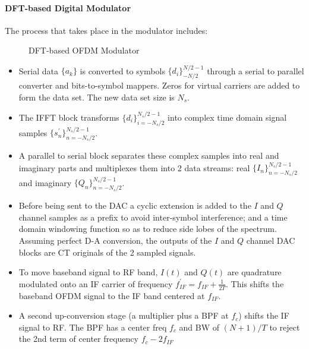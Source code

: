 \paragraph{\gls{DFT}-based Digital Modulator}
The process that takes place in the modulator includes\cite{fuqin}:
\begin{figure}[h!]
	\centerline{\resizebox{16cm}{!}{}}
	\caption{\gls{DFT}-based \gls{OFDM} Modulator}
	\label{fig:dft_mod}
\end{figure}
\begin{itemize}
	\item Serial data $\{ a_k\}$ is converted to symbols  $\{ d_i\}_{-N/2}^{N/2-1}$ through a serial to parallel converter and bits-to-symbol mappers. Zeros for virtual carriers are added to form the data set. The new data set size is $N_s$.
	\item The \gls{IFFT} block transforms $\{ d_i\}_{i=-N_s/2}^{N_s/2-1}$ into complex time domain signal samples $\{ s_n^\prime\}_{n=-N_s/2}^{N_s/2-1}$.
	\item A parallel to serial block separates these complex samples into real and imaginary parts and multiplexes them into 2 data streams: real $\{ I_n\}_{n=-N_s/2}^{N_s/2-1}$ and imaginary $\{ Q_n\}_{n=-N_s/2}^{N_s/2-1}$.
	\item Before being sent to the \gls{DAC} a cyclic extension is added to the $I$ and $Q$ channel samples as a prefix to avoid inter-symbol interference; and a time domain windowing function so as to reduce side lobes of the spectrum. Assuming perfect D-A conversion, the outputs of the $I$ and $Q$ channel \gls{DAC} blocks are CT originals of the 2 sampled signals.
	\item To move baseband signal to RF band, $I(t)$ and $Q(t)$ are quadrature modulated onto an \gls{IF} carrier of frequency $f_{IF}^\prime = f_{IF} + \frac{1}{2T}$. This shifts the baseband \gls{OFDM} signal to the \gls{IF} band centered at $f_{IF}$.
	\item A second up-conversion stage (a multiplier plus a \gls{BPF} at $f_c$) shifts the \gls{IF} signal to \gls{RF}. The \gls{BPF} has a center freq $f_c$ and BW of $(N+1)/T$ to reject the 2nd term of center frequency $f_c-2f_{IF}$
\end{itemize}

